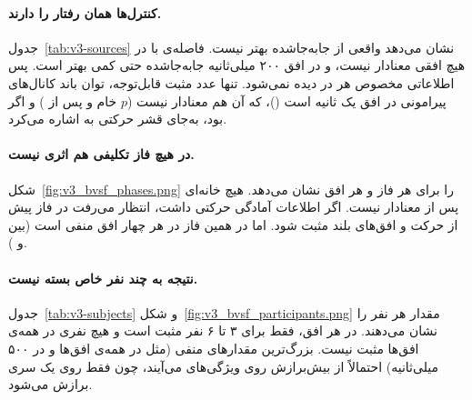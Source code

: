 \begin{table}[htbp]
\centering\small
\caption{مقایسه‌ی اصلی روی همه‌ی های آزمون، با  واقعی. «معنادار در» تعداد نفرهایی است که  مثبت و $p$ کمتر از  دارند.}
\label{tab:v3-bvsf}
\resizebox{\textwidth}{!}{}
\end{table}


\paragraph{کنترل‌ها همان رفتار را دارند.} جدول~\ref{tab:v3-sources} نشان می‌دهد  واقعی از  جابه‌جاشده بهتر نیست. فاصله‌ی  با  در هیچ افقی معنادار نیست، و در افق ۲۰۰ میلی‌ثانیه  جابه‌جاشده حتی کمی بهتر است. پس اطلاعاتی مخصوص هر  در  دیده نمی‌شود. تنها عدد مثبت قابل‌توجه، توان باند کانال‌های پیرامونی در افق یک ثانیه است ()، که آن هم معنادار نیست ($p$ خام  و پس از  ) و اگر بود، به‌جای قشر حرکتی به  اشاره می‌کرد.

\begin{table}[htbp]
\centering\small
\caption{میانگین  برای هر منبع  ورودی ، همه‌ی های آزمون.}
\label{tab:v3-sources}

\end{table}

\paragraph{در هیچ فاز تکلیفی هم اثری نیست.} شکل~\ref{fig:v3_bvsf_phases.png}  را برای هر فاز و هر افق نشان می‌دهد. هیچ خانه‌ای پس از  معنادار نیست. اگر  اطلاعات آمادگی حرکتی داشت، انتظار می‌رفت در فاز پیش از حرکت و افق‌های بلند مثبت شود. اما در همین فاز  در هر چهار افق منفی است (بین  و ).


\paragraph{نتیجه به چند نفر خاص بسته نیست.} جدول~\ref{tab:v3-subjects} و شکل~\ref{fig:v3_bvsf_participants.png} مقدار هر نفر را نشان می‌دهند. در هر افق،  فقط برای ۳ تا ۶ نفر مثبت است و هیچ نفری در همه‌ی افق‌ها مثبت نیست. بزرگ‌ترین مقدارهای منفی (مثل  در همه‌ی افق‌ها و  در ۵۰۰ میلی‌ثانیه) احتمالاً از بیش‌برازش  روی ویژگی‌های  می‌آیند، چون  فقط روی یک سری  برازش می‌شود.

